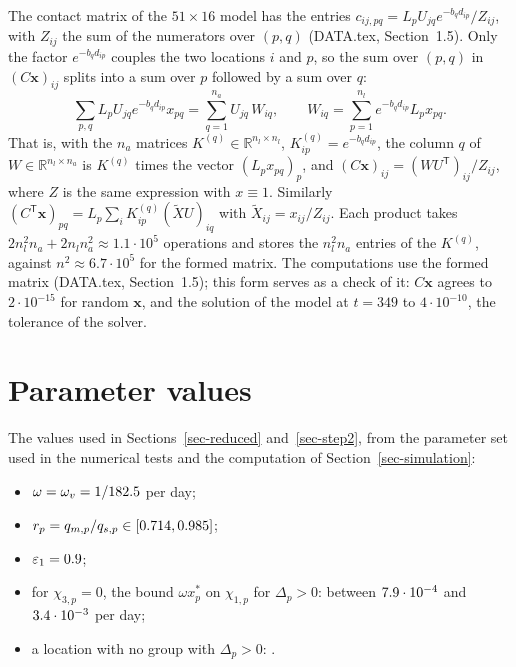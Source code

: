 \documentclass[11pt]{article}
\theoremstyle{plain}
\theoremstyle{remark}
\numberwithin{equation}{section}
\begin{document}
The contact matrix of the $51\times16$ model has the entries
$c_{ij,pq}=L_pU_{jq}e^{-b_qd_{ip}}/Z_{ij}$, with $Z_{ij}$ the sum of the numerators
over $(p,q)$ (DATA.tex, Section~1.5). Only the factor $e^{-b_qd_{ip}}$ couples the two
locations $i$ and $p$, so the sum over $(p,q)$ in $(C\bm x)_{ij}$ splits into a sum
over $p$ followed by a sum over $q$:
\begin{equation*}
\sum_{p,q}L_pU_{jq}e^{-b_qd_{ip}}x_{pq}
=\sum_{q=1}^{n_a}U_{jq}\,W_{iq},\qquad
W_{iq}=\sum_{p=1}^{n_l}e^{-b_qd_{ip}}L_px_{pq}.
\end{equation*}
That is, with the $n_a$ matrices $K^{(q)}\in\mathbb R^{n_l\times n_l}$,
$K^{(q)}_{ip}=e^{-b_qd_{ip}}$, the column $q$ of $W\in\mathbb R^{n_l\times n_a}$ is
$K^{(q)}$ times the vector $(L_px_{pq})_p$, and
$(C\bm x)_{ij}=\left(WU^{\mathsf T}\right)_{ij}/Z_{ij}$, where $Z$ is the same
expression with $x\equiv1$. Similarly
$(C^{\mathsf T}\bm x)_{pq}=L_p\sum_iK^{(q)}_{ip}\left(\widetilde XU\right)_{iq}$ with
$\widetilde X_{ij}=x_{ij}/Z_{ij}$. Each product takes $2n_l^2n_a+2n_ln_a^2\approx1.1\cdot10^5$
operations and stores the $n_l^2n_a$ entries of the $K^{(q)}$, against $n^2\approx
6.7\cdot10^5$ for the formed matrix. The computations use the formed matrix
(DATA.tex, Section~1.5); this form serves as a check of it: $C\bm x$ agrees to
$2\cdot10^{-15}$ for random $\bm x$, and the solution of the model at $t=349$
to $4\cdot10^{-10}$, the tolerance of the solver.

\section{Parameter values}\label{app-values}

The values used in Sections~\ref{sec-reduced} and~\ref{sec-step2}, from the parameter set
used in the numerical tests and the computation of Section~\ref{sec-simulation}:
\begin{itemize}
\item $\omega=\omega_v=1/182.5$ per day;
\item $r_p=q_{m,p}/q_{s,p}\in[0.714,0.985]$;
\item $\varepsilon_1=0.9$\RunEpsFirstTo;
\item for $\chi_{3,p}=0$, the bound $\omega x_p^*$ on $\chi_{1,p}$ for $\Delta_p>0$: between
$7.9\cdot10^{-4}$ and $3.4\cdot10^{-3}$ per day\RunDeltaLast;
\item a location with no group with $\Delta_p>0$: \RunDeltaText.
\end{itemize}


\end{document}
